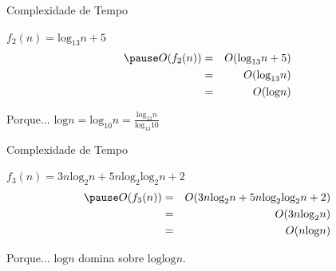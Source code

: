 \documentclass[xcolor=dvipsnames,table]{beamer}
\begin{document}
	\begin{frame}{Complexidade de Tempo}
		\begin{block}{$f_2 (n) = \mbox{log}_{13} n + 5$}
			\begin{eqnarray} \pause
			O(f_2(n)) & = & O(\mbox{log}_{13} n + 5)\\
			& = & O(\mbox{log}_{13} n)\\
			& = & O(\mbox{log} n)
			\end{eqnarray}
		\end{block} \pause
		\begin{exampleblock}{Porque...}
			$\mbox{log} n = \mbox{log}_{10} n  = \frac{\mbox{log}_{13} n}{\mbox{log}_{13} 10}$
		\end{exampleblock}
	\end{frame}
	
	\begin{frame}{Complexidade de Tempo}
		\begin{block}{$f_3 (n) =  3n \mbox{log}_2 n + 5n \mbox{log}_2 \mbox{log}_2 n + 2$}
			\begin{eqnarray} \pause
			O(f_3(n)) & = & O(3n \mbox{log}_2 n + 5n \mbox{log}_2 \mbox{log}_2 n + 2)\\
			& = & O(3n \mbox{log}_2 n)\\
			& = & O(n \mbox{log} n)
			\end{eqnarray}
		\end{block} \pause
		\begin{exampleblock}{Porque...}
			$\mbox{log} n$ domina sobre $\mbox{log} \mbox{log} n$.
		\end{exampleblock}
	\end{frame}
	
	\begin{frame}
		\titlepage
	\end{frame}
	
\end{document}
